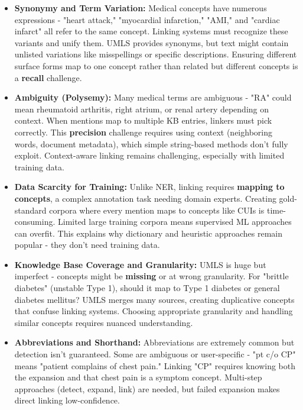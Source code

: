 \begin{itemize}
  \item \textbf{Synonymy and Term Variation:} Medical concepts have numerous expressions - "heart attack," "myocardial infarction," "AMI," and "cardiac infarct" all refer to the same concept. Linking systems must recognize these variants and unify them. UMLS provides synonyms, but text might contain unlisted variations like misspellings or specific descriptions. Ensuring different surface forms map to one concept rather than related but different concepts is a \textbf{recall} challenge.

  \item \textbf{Ambiguity (Polysemy):} Many medical terms are ambiguous - "RA" could mean rheumatoid arthritis, right atrium, or renal artery depending on context. When mentions map to multiple KB entries, linkers must pick correctly. This \textbf{precision} challenge requires using context (neighboring words, document metadata), which simple string-based methods don't fully exploit. Context-aware linking remains challenging, especially with limited training data.

  \item \textbf{Data Scarcity for Training:} Unlike NER, linking requires \textbf{mapping to concepts}, a complex annotation task needing domain experts. Creating gold-standard corpora where every mention maps to concepts like CUIs is time-consuming. Limited large training corpora means supervised ML approaches can overfit. This explains why dictionary and heuristic approaches remain popular - they don't need training data.

  \item \textbf{Knowledge Base Coverage and Granularity:} UMLS is huge but imperfect - concepts might be \textbf{missing} or at wrong granularity. For "brittle diabetes" (unstable Type 1), should it map to Type 1 diabetes or general diabetes mellitus? UMLS merges many sources, creating duplicative concepts that confuse linking systems. Choosing appropriate granularity and handling similar concepts requires nuanced understanding.

  \item \textbf{Abbreviations and Shorthand:} Abbreviations are extremely common but detection isn't guaranteed. Some are ambiguous or user-specific - "pt c/o CP" means "patient complains of chest pain." Linking "CP" requires knowing both the expansion and that chest pain is a symptom concept. Multi-step approaches (detect, expand, link) are needed, but failed expansion makes direct linking low-confidence.


\end{itemize}
